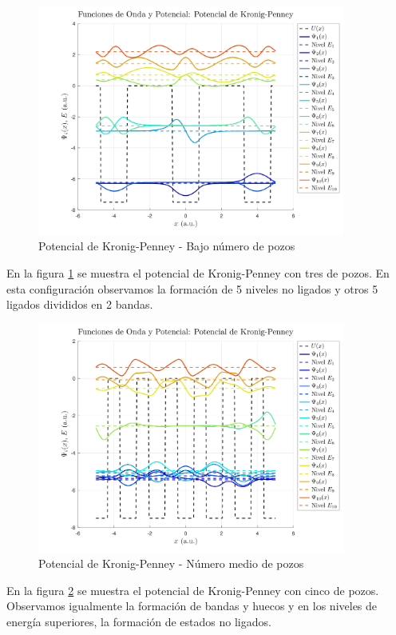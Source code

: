 \documentclass[a4paper,12pt]{article}
\begin{document}
\begin{figure}[H]
    \centering
    \includegraphics[width=0.9\textwidth]{img/Potencial_de_Kronig-Penney_low.png}
    \caption{Potencial de Kronig-Penney - Bajo número de pozos}
    \label{fig:kronig_penney_low}
\end{figure}

En la figura \ref{fig:kronig_penney_low} se muestra el potencial de Kronig-Penney con tres de pozos. En esta configuración observamos la formación de 5 niveles no ligados y otros 5 ligados divididos en 2 bandas.

\begin{figure}[H]
    \centering
    \includegraphics[width=0.9\textwidth]{img/Potencial_de_Kronig-Penney_medium.png}
    \caption{Potencial de Kronig-Penney - Número medio de pozos}
    \label{fig:kronig_penney_medium}
\end{figure}
En la figura \ref{fig:kronig_penney_medium} se muestra el potencial de Kronig-Penney con cinco de pozos. Observamos igualmente la formación de bandas y huecos y en los niveles de energía superiores, la formación de estados no ligados.
\end{document}
